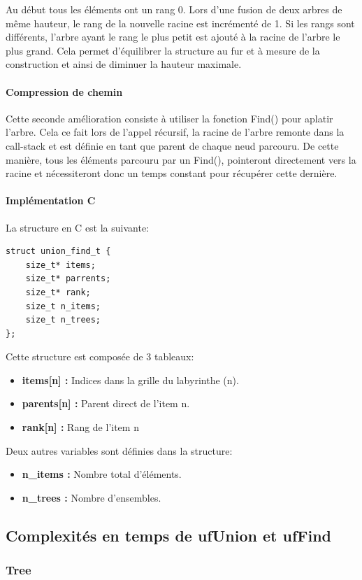 \documentclass[11pt]{article}
\begin{document}
	Au début tous les éléments ont un rang 0. Lors d'une fusion de deux arbres de même hauteur, le rang de la nouvelle racine est incrémenté de 1. Si les rangs sont différents, l'arbre ayant le rang le plus petit est ajouté à la racine de l'arbre le plus grand. Cela permet d'équilibrer la structure au fur et à mesure de la construction et ainsi de diminuer la hauteur maximale.
	
	\paragraph{Compression de chemin}
	Cette seconde amélioration consiste à utiliser la fonction Find() pour aplatir l'arbre. Cela ce fait lors de l'appel récursif, la racine de l'arbre remonte dans la call-stack et est définie en tant que parent de chaque neud parcouru. De cette manière, tous les éléments parcouru par un Find(), pointeront directement vers la racine et nécessiteront donc un temps constant pour récupérer cette dernière.
	\paragraph{Implémentation C}	
	La structure en C est la suivante:
	\begin{lstlisting}[style=CStyle]
struct union_find_t {
    size_t* items;
    size_t* parrents;
    size_t* rank;
    size_t n_items;
    size_t n_trees;
};
\end{lstlisting}

Cette structure est composée de 3 tableaux:
\begin{itemize}
\item \textbf{items[n] :} Indices dans la grille du labyrinthe (n).
\item \textbf{parents[n] :} Parent direct de l'item n.
\item \textbf{rank[n] :} Rang de l'item n
\end{itemize}
Deux autres variables sont définies dans la structure:
\begin{itemize}
\item \textbf{n\_items :} Nombre total d'éléments.
\item \textbf{n\_trees :} Nombre d'ensembles.
\end{itemize}
	\subsection{Complexités en temps de ufUnion et ufFind}
		\subsubsection{Tree}
\end{document}
